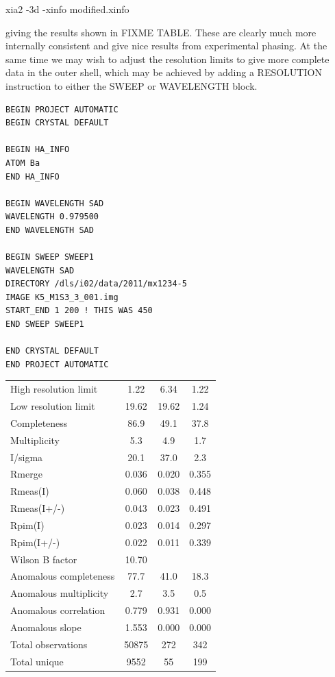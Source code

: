 \documentclass[a4paper, 11pt]{article}
\begin{document}
\begin{center}
{\huge
xia2 -3d -xinfo modified.xinfo
}
\end{center}

\noindent
giving the results shown in FIXME TABLE. These are clearly much more internally
consistent and give nice results from experimental phasing. At the same time 
we may wish to adjust the resolution limits to give more complete data in the 
outer shell, which may be achieved by adding a RESOLUTION instruction to 
either the SWEEP or WAVELENGTH block.

\begin{verbatim}
BEGIN PROJECT AUTOMATIC
BEGIN CRYSTAL DEFAULT

BEGIN HA_INFO
ATOM Ba
END HA_INFO

BEGIN WAVELENGTH SAD
WAVELENGTH 0.979500
END WAVELENGTH SAD

BEGIN SWEEP SWEEP1
WAVELENGTH SAD
DIRECTORY /dls/i02/data/2011/mx1234-5
IMAGE K5_M1S3_3_001.img
START_END 1 200 ! THIS WAS 450
END SWEEP SWEEP1

END CRYSTAL DEFAULT
END PROJECT AUTOMATIC
\end{verbatim}

\begin{tabular}{lccc}
High resolution limit         &         1.22 &  6.34 &  1.22 \\
Low resolution limit          &        19.62 & 19.62 &  1.24 \\
Completeness                  &         86.9 &  49.1 &  37.8 \\
Multiplicity                  &        5.3  &  4.9   & 1.7 \\
I/sigma                       &        20.1 &  37.0  &  2.3 \\
Rmerge                        &       0.036 & 0.020  &0.355 \\
Rmeas(I)                      &       0.060 & 0.038  &0.448 \\
Rmeas(I+/-)                   &       0.043 & 0.023  &0.491 \\
Rpim(I)                       &       0.023 & 0.014  &0.297 \\
Rpim(I+/-)                    &       0.022 & 0.011  &0.339 \\
Wilson B factor               &       10.70& \\
Anomalous completeness        &        77.7  & 41.0  & 18.3 \\
Anomalous multiplicity        &         2.7  &  3.5  &  0.5 \\
Anomalous correlation         &        0.779 & 0.931 & 0.000 \\
Anomalous slope               &       1.553  &0.000 & 0.000 \\
Total observations            &       50875  &272   & 342 \\
Total unique                  &       9552   &55    & 199 \\
\end{tabular}
\end{document}
